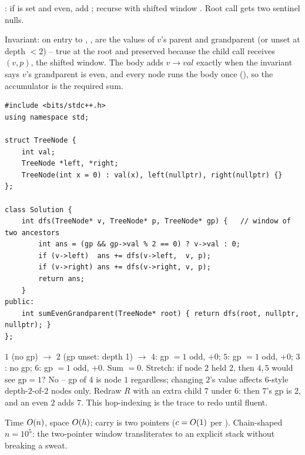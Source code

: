 : if  is set and even, add ; recurse
with shifted window . Root call gets two sentinel nulls.

\begin{proofbox}
Invariant: on entry to , ,  are the values of
$v$'s parent and grandparent (or unset at depth $<2$) -- true at the root and
preserved because the child call receives $(v, p)$, the shifted window. The
body adds $v\to\mathit{val}$ exactly when the invariant says $v$'s grandparent
is even, and every node runs the body once (), so the
accumulator is the required sum.
\end{proofbox}

\begin{lstlisting}[caption={Even Grandparent Sum (LeetCode 1315)}, label={lst:c02-grandparent}]
#include <bits/stdc++.h>
using namespace std;

struct TreeNode {
    int val;
    TreeNode *left, *right;
    TreeNode(int x = 0) : val(x), left(nullptr), right(nullptr) {}
};

class Solution {
    int dfs(TreeNode* v, TreeNode* p, TreeNode* gp) {   // window of two ancestors
        int ans = (gp && gp->val % 2 == 0) ? v->val : 0;
        if (v->left)  ans += dfs(v->left,  v, p);
        if (v->right) ans += dfs(v->right, v, p);
        return ans;
    }
public:
    int sumEvenGrandparent(TreeNode* root) { return dfs(root, nullptr, nullptr); }
};
\end{lstlisting}

\begin{tracebox}[On $R$]
$1$ (no gp) $\to$ $2$ (gp unset: depth 1) $\to$ $4$: gp $=1$ odd, $+0$;
$5$: gp $=1$ odd, $+0$; $3$: no gp; $6$: gp $=1$ odd, $+0$. Sum $=0$.
Stretch: if node $2$ held $2$, then $4,5$ would see gp$=1$? No -- gp of $4$ is
node $1$ regardless; changing $2$'s value affects $6$-style depth-$2$-of-$2$
nodes only. Redraw $R$ with an extra child $7$ under $6$: then $7$'s gp is $2$,
and an even $2$ adds $7$. This hop-indexing is the trace to redo until fluent.
\end{tracebox}

\begin{complexitybox}
Time $O(n)$, space $O(h)$; carry is two pointers ($c=O(1)$ per
). Chain-shaped $n=10^{5}$: the two-pointer window
transliterates to an explicit stack without breaking a sweat.
\end{complexitybox}

